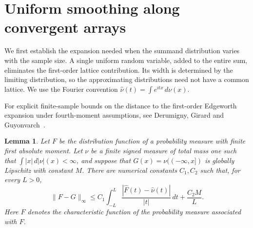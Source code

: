 \documentclass[aop]{imsart}
\theoremstyle{plain}
\newtheorem{lemma}[theorem]{Lemma}
\theoremstyle{definition}
\theoremstyle{definition}
\begin{document}
\section{Uniform smoothing along convergent arrays}\label{sec:smoothing}

We first establish the expansion needed when the summand distribution varies
with the sample size.  A single uniform random variable, added to the entire
sum, eliminates the first-order lattice contribution.  Its width is determined
by the limiting distribution, so the approximating distributions need not
have a common lattice.  We use the Fourier convention
\(\widehat\nu(t)=\int e^{itx}\,d\nu(x)\).

For explicit finite-sample bounds on the distance to the first-order
Edgeworth expansion under fourth-moment assumptions, see
Derumigny, Girard and Guyonvarch~\cite{DerumignyGirardGuyonvarch2024}.

\begin{lemma}\label{lem:signed-smoothing}
Let \(F\) be the distribution function of a probability measure with finite
first absolute moment.  Let \(\nu\) be a finite signed measure of total mass
one such that \(\int |x|\,d|\nu|(x)<\infty\), and suppose that
\(G(x)=\nu(( -\infty,x])\) is globally Lipschitz with constant \(M\).
There are numerical constants \(C_1,C_2\) such that, for every \(L>0\),
\begin{equation}\label{eq:signed-smoothing}
 \|F-G\|_\infty
 \le C_1\int_{-L}^{L}
       \frac{|\widehat F(t)-\widehat\nu(t)|}{|t|}\,dt
       +\frac{C_2M}{L}.
\end{equation}
Here \(\widehat F\) denotes the characteristic function of the probability
measure associated with \(F\).
\end{lemma}
\end{document}
